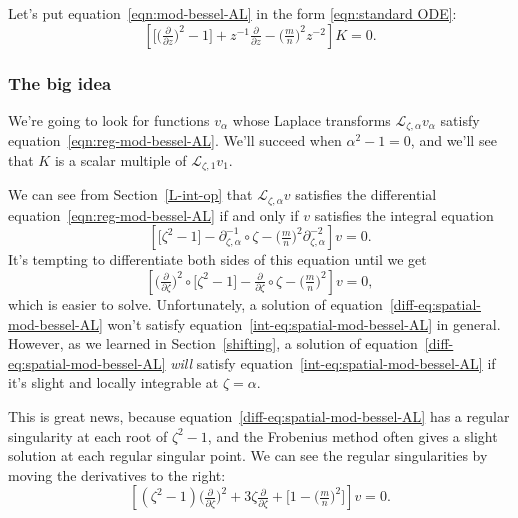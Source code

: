 \documentclass{article}
\newcommand{\fracderiv}[3]{\partial^{#1}_{#2, #3}}
\newcommand{\laplace}{\mathcal{L}}
\begin{document}
Let's put equation~\eqref{eqn:mod-bessel-AL} in the form \eqref{eqn:standard ODE}:
\begin{equation}\label{eqn:reg-mod-bessel-AL}
\left[ \big[ \big(\tfrac{\partial}{\partial z}\big)^2 - 1 \big] + z^{-1} \tfrac{\partial}{\partial z} - \big({\tfrac{m}{n}}\big)^2 z^{-2} \right] K = 0.
\end{equation}


\subsubsection{The big idea}\label{big-idea}
We're going to look for functions $v_\alpha$ whose Laplace transforms $\laplace_{\zeta, \alpha} v_\alpha$ satisfy equation~\eqref{eqn:reg-mod-bessel-AL}. We'll succeed when $\alpha^2 - 1 = 0$, and we'll see that $K$ is a scalar multiple of $\laplace_{\zeta, 1} v_1$.

We can see from Section~\ref{L-int-op} that $\laplace_{\zeta, \alpha} v$ satisfies the differential equation~\eqref{eqn:reg-mod-bessel-AL} if and only if $v$ satisfies the integral equation
\begin{equation}\label{int-eq:spatial-mod-bessel-AL}
\left[ \big[ \zeta^2 - 1 \big] - \fracderiv{-1}{\zeta}{\alpha} \circ \zeta - \big(\tfrac{m}{n}\big)^2 \fracderiv{-2}{\zeta}{\alpha} \right] v = 0.
\end{equation}
It's tempting to differentiate both sides of this equation until we get
\begin{equation}\label{diff-eq:spatial-mod-bessel-AL}
\left[ \big(\tfrac{\partial}{\partial \zeta}\big)^2 \circ \big[ \zeta^2 - 1 \big] - \tfrac{\partial}{\partial \zeta} \circ \zeta - \big(\tfrac{m}{n}\big)^2 \right] v = 0,
\end{equation}
which is easier to solve. Unfortunately, a solution of equation~\eqref{diff-eq:spatial-mod-bessel-AL} won't satisfy equation~\eqref{int-eq:spatial-mod-bessel-AL} in general. However, as we learned in Section~\ref{shifting}, a solution of equation~\eqref{diff-eq:spatial-mod-bessel-AL} {\em will} satisfy equation~\eqref{int-eq:spatial-mod-bessel-AL} if it's slight and locally integrable at $\zeta = \alpha$.

This is great news, because equation~\ref{diff-eq:spatial-mod-bessel-AL} has a regular singularity at each root of $\zeta^2 - 1$, and the Frobenius method often gives a slight solution at each regular singular point. We can see the regular singularities by moving the derivatives to the right:
\[ \left[ (\zeta^2 - 1) \big(\tfrac{\partial}{\partial \zeta}\big)^2 + 3\zeta \tfrac{\partial}{\partial \zeta} + \big[ 1 - \big(\tfrac{m}{n}\big)^2 \big] \right] v = 0. \]
\end{document}
